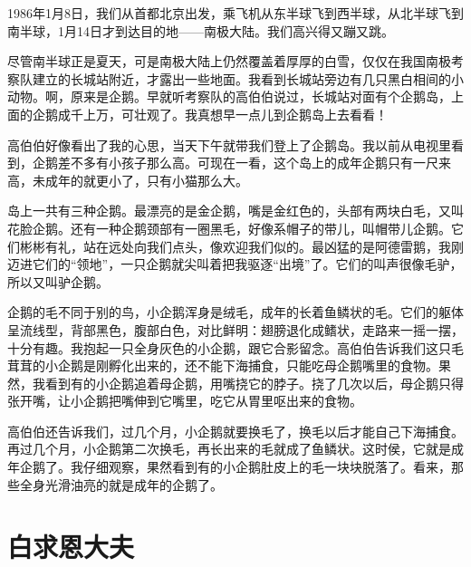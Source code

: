\documentclass[12pt,UTF-8,openany]{ctexbook}
\begin{document}
\begin{large}
    
    1986年1月8日，我们从首都北京出发，乘飞机从东半球飞到西半球，从北半球飞到南半球，1月14日才到达目的地——南极大陆。我们高兴得又蹦又跳。
    
    尽管南半球正是夏天，可是南极大陆上仍然覆盖着厚厚的白雪，仅仅在我国南极考察队建立的长城站附近，才露出一些地面。我看到长城站旁边有几只黑白相间的小动物。啊，原来是企鹅。早就听考察队的高伯伯说过，长城站对面有个企鹅岛，上面的企鹅成千上万，可壮观了。我真想早一点儿到企鹅岛上去看看！
    
    高伯伯好像看出了我的心思，当天下午就带我们登上了企鹅岛。我以前从电视里看到，企鹅差不多有小孩子那么高。可现在一看，这个岛上的成年企鹅只有一尺来高，未成年的就更小了，只有小猫那么大。
    
    岛上一共有三种企鹅。最漂亮的是金企鹅，嘴是金红色的，头部有两块白毛，又叫花脸企鹅。还有一种企鹅颈部有一圈黑毛，好像系帽子的带儿，叫帽带儿企鹅。它们彬彬有礼，站在远处向我们点头，像欢迎我们似的。最凶猛的是阿德雷鹅，我刚迈进它们的“领地”，一只企鹅就尖叫着把我驱逐“出境”了。它们的叫声很像毛驴，所以又叫驴企鹅。
    
    企鹅的毛不同于别的鸟，小企鹅浑身是绒毛，成年的长着鱼鳞状的毛。它们的躯体呈流线型，背部黑色，腹部白色，对比鲜明：翅膀退化成鳍状，走路来一摇一摆，十分有趣。我抱起一只全身灰色的小企鹅，跟它合影留念。高伯伯告诉我们这只毛茸茸的小企鹅是刚孵化出来的，还不能下海捕食，只能吃母企鹅嘴里的食物。果然，我看到有的小企鹅追着母企鹅，用嘴挠它的脖子。挠了几次以后，母企鹅只得张开嘴，让小企鹅把嘴伸到它嘴里，吃它从胃里呕出来的食物。
    
    高伯伯还告诉我们，过几个月，小企鹅就要换毛了，换毛以后才能自己下海捕食。再过几个月，小企鹅第二次换毛，再长出来的毛就成了鱼鳞状。这时侯，它就是成年企鹅了。我仔细观察，果然看到有的小企鹅肚皮上的毛一块块脱落了。看来，那些全身光滑油亮的就是成年的企鹅了。
    
\end{large}



\chapter{白求恩大夫}
\end{document}
